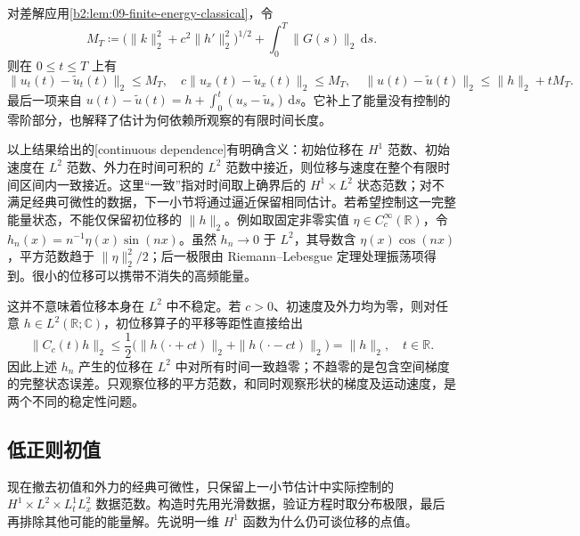 对差解应用\cref{b2:lem:09-finite-energy-classical}，令
\[
 M_T\coloneqq\bigl(\|k\|_2^2+c^2\|h'\|_2^2\bigr)^{1/2}
                +\int_0^T\|G(s)\|_2\,\mathrm{d}s.
\]
则在 \(0\leq t\leq T\) 上有
\begin{equation}\label{b2:eq:09-stability}
 \|u_t(t)-\widetilde u_t(t)\|_2\leq M_T,\quad
 c\|u_x(t)-\widetilde u_x(t)\|_2\leq M_T,\quad
 \|u(t)-\widetilde u(t)\|_2\leq\|h\|_2+tM_T.
\end{equation}
最后一项来自 \(u(t)-\widetilde u(t)=h+\int_0^t(u_s-\widetilde u_s)\,\mathrm{d}s\)。它补上了能量没有控制的零阶部分，也解释了估计为何依赖所观察的有限时间长度。

\ProseParagraphBreak

以上结果给出的[continuous dependence]有明确含义：初始位移在 \(H^1\) 范数、初始速度在 \(L^2\) 范数、外力在时间可积的 \(L^2\) 范数中接近，则位移与速度在整个有限时间区间内一致接近。这里“一致”指对时间取上确界后的 \(H^1\times L^2\) 状态范数；对不满足经典可微性的数据，下一小节将通过逼近保留相同估计。若希望控制这一完整能量状态，不能仅保留初位移的 \(\|h\|_2\)。例如取固定非零实值 \(\eta\in C_c^\infty(\mathbb R)\)，令 \(h_n(x)=n^{-1}\eta(x)\sin(nx)\)。虽然 \(h_n\to0\) 于 \(L^2\)，其导数含 \(\eta(x)\cos(nx)\)，平方范数趋于 \(\|\eta\|_2^2/2\)；后一极限由 Riemann--Lebesgue 定理处理振荡项得到。很小的位移可以携带不消失的高频能量。

\ProseParagraphBreak

这并不意味着位移本身在 \(L^2\) 中不稳定。若 \(c>0\)、初速度及外力均为零，则对任意 \(h\in L^2(\mathbb R;\mathbb C)\)，初位移算子的平移等距性直接给出
\[
 \|C_c(t)h\|_2\leq\frac12\bigl(\|h(\cdot+ct)\|_2+\|h(\cdot-ct)\|_2\bigr)=\|h\|_2,
 \quad t\in\mathbb R.
\]
因此上述 \(h_n\) 产生的位移在 \(L^2\) 中对所有时间一致趋零；不趋零的是包含空间梯度的完整状态误差。只观察位移的平方范数，和同时观察形状的梯度及运动速度，是两个不同的稳定性问题。

\subsection{低正则初值}
\label{b2:subsec:090304}

现在撤去初值和外力的经典可微性，只保留上一小节估计中实际控制的 \(H^1\times L^2\times L^1_tL^2_x\) 数据范数。构造时先用光滑数据，验证方程时取分布极限，最后再排除其他可能的能量解。先说明一维 \(H^1\) 函数为什么仍可谈位移的点值。

